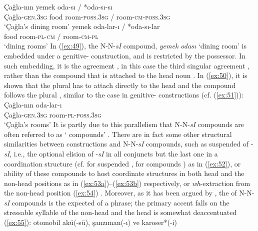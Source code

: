 \documentclass[output=paper]{LSP/langsci}
\begin{document}
\ea\label{ex:49}
	\gll Çağla-nın yemek oda-sı / *oda-sı-sı\\
			Çağla-\textsc{gen.3sg} food room-\textsc{poss.3sg} / room-\textsc{cm-poss.3sg}\\
	\glt `Çağla's dining room'
\z
\ea\label{ex:50}
	\gll 	yemek oda-lar-ı / *oda-sı-lar\\
			food room-\textsc{pl}-\textsc{cm} / room-\textsc{cm}-\textsc{pl}\\
	\glt `dining rooms'
\z
In (\ref{ex:49}), the N-N-\textit{sI} compound, \textit{yemek odası} `dining room' is embedded under a genitive- construction, and is restricted by the  possessor. In such embedding, it is the  agreement , in this case the third singular agreement , rather than the compound  that is attached to the head noun \citep{Dede1978,Goksel1988,Kornfilt1986,Schaaik2002}. In (\ref{ex:50}), it is shown that the plural  has to attach directly to the head and the compound  follows the plural , similar to the case in genitive- constructions (cf. (\ref{ex:51})):
\ea\label{ex:51}
	\gll Çağla-nın oda-lar-ı\\
			Çağla-\textsc{gen.3sg} room-\textsc{pl-}\textsc{poss.3sg}\\
	\glt `Çağla's rooms'
\z
It is partly due to this parallelism that N-N-\textit{sI} compounds are often referred to as ` compounds' \citep{Schaaik1992,Hayashi1996,Yukseker1998}. There are in fact some other structural similarities between  constructions and N-N-\textit{sI} compounds, such as suspended  of -\textit{sI}, i.e., the optional elision of -\textit{sI} in all conjuncts but the last one in a coordination structure (cf. \citealt{Kornfilt2012} for suspended , for compounds \citealt{BagriacikRalli2015}) as in (\ref{ex:52}), or ability of these compounds to host coordinate structures in both head and the non-head positions as in  (\ref{ex:53a})--(\ref{ex:53b}) respectively, or \textit{wh}-extraction from the non-head position (\ref{ex:54}) \citep{Uygun2009,Goksel2009, BagriacikRalli2013a,BagriacikRalli2015}. Moreover, as it has been argued by \citet{KamaliIkizoglu}, the  of N-N-\textit{sI} compounds is the expected  of a phrase; the primary accent falls on the stressable syllable of the non-head and the head is somewhat deaccentuated (\ref{ex:55}):
\ea\label{ex:52}
	\gll otomobil  akü(-sü), şanzıman(-ı) ve karoser*(-i)\\
\end{document}
